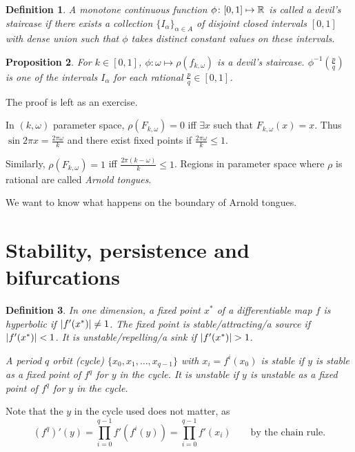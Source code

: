 \documentclass{notes}
\theoremstyle{plain}
\newtheorem{proposition}{Proposition}[chapter]
\newtheorem{definition}[proposition]{Definition}
\begin{document}
\begin{definition}
  A monotone continuous function $\phi \colon [0,1] \mapsto \mathbb{R}$ is
  called a \emph{devil's staircase} if there exists a collection $\{
  I_\alpha \}_{\alpha \in A}$ of disjoint closed intervals $[0,1]$
  with dense union such that $\phi$ takes distinct constant values on
  these intervals.
\end{definition}

\begin{proposition}
  For $k \in [0,1]$, $\phi \colon \omega \mapsto \rho(f_{k,\omega})$
  is a devil's staircase.  $\phi^{-1}\left( \tfrac{p}{q}\right)$
  is one of the intervals $I_\alpha$ for each rational $\tfrac{p}{q}
  \in [0,1]$.
\end{proposition}

The proof is left as an exercise.
\vspace{2in}

In $(k,\omega)$ parameter space, $\rho(F_{k,\omega}) = 0$ iff
$\exists x$ such that $F_{k,\omega}(x)=x$.  Thus $\sin 2 \pi x
= \tfrac{2 \pi \omega}{k}$ and there exist fixed points if
$\tfrac{2 \pi \omega}{k} \le 1$.

Similarly, $\rho(F_{k,\omega}) = 1$ iff $\tfrac{2 \pi(k-\omega)}{k} \le 1$.
Regions in parameter space where $\rho$ is rational are called
\emph{Arnold tongues}.

\vspace{2in}

We want to know what happens on the boundary of Arnold tongues.

\section{Stability, persistence and bifurcations}

\begin{definition}
In one dimension, a fixed point $x^\ast$ of a differentiable map
$f$ is \emph{hyperbolic} if $\left|f'(x^\ast)\right| \neq 1$.  The fixed
point is \emph{stable/attracting/a source} if $\left|f'(x^\ast)\right| < 1$.
It is \emph{unstable/repelling/a sink} if $\abs{f'(x^\ast)}>1$.

A period $q$ orbit (cycle) $\{ x_0, x_1,\dots, x_{q-1} \}$ with $x_i =
f^{i}(x_0)$ is stable if $y$ is stable as a fixed point of $f^q$ for
$y$ in the cycle.  It is unstable if $y$ is unstable as a fixed point
of $f^q$ for $y$ in the cycle.
\end{definition}

Note that the $y$ in the cycle used does not matter, as
\[
(f^q)'(y) = \prod_{i=0}^{q-1} f'\left(f^i(y)\right)
= \prod_{i=0}^{q-1} f'(x_i) \qquad \text{by the chain rule.}
\]
\end{document}
